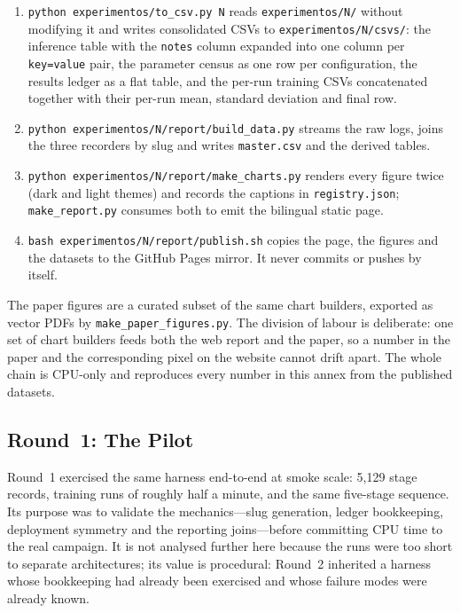 \begin{enumerate}[leftmargin=*]
    \item \texttt{python experimentos/to\_csv.py N} reads \texttt{experimentos/N/} without modifying it and writes consolidated CSVs to \texttt{experimentos/N/csvs/}: the inference table with the \texttt{notes} column expanded into one column per \texttt{key=value} pair, the parameter census as one row per configuration, the results ledger as a flat table, and the per-run training CSVs concatenated together with their per-run mean, standard deviation and final row.
    \item \texttt{python experimentos/N/report/build\_data.py} streams the raw logs, joins the three recorders by slug and writes \texttt{master.csv} and the derived tables.
    \item \texttt{python experimentos/N/report/make\_charts.py} renders every figure twice (dark and light themes) and records the captions in \texttt{registry.json}; \texttt{make\_report.py} consumes both to emit the bilingual static page.
    \item \texttt{bash experimentos/N/report/publish.sh} copies the page, the figures and the datasets to the GitHub Pages mirror. It never commits or pushes by itself.
\end{enumerate}

The paper figures are a curated subset of the same chart builders, exported as vector PDFs by \texttt{make\_paper\_figures.py}. The division of labour is deliberate: one set of chart builders feeds both the web report and the paper, so a number in the paper and the corresponding pixel on the website cannot drift apart. The whole chain is CPU-only and reproduces every number in this annex from the published datasets.

\subsection{Round~1: The Pilot}

Round~1 exercised the same harness end-to-end at smoke scale: 5{,}129 stage records, training runs of roughly half a minute, and the same five-stage sequence. Its purpose was to validate the mechanics---slug generation, ledger bookkeeping, deployment symmetry and the reporting joins---before committing CPU time to the real campaign. It is not analysed further here because the runs were too short to separate architectures; its value is procedural: Round~2 inherited a harness whose bookkeeping had already been exercised and whose failure modes were already known.
